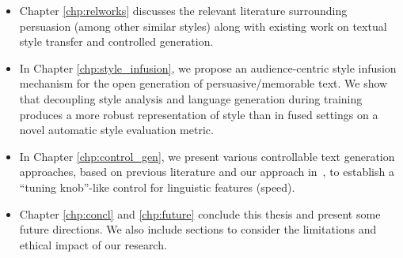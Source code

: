 \begin{itemize}
    \item Chapter \ref{chp:relworks} discusses the relevant literature surrounding persuasion (among other similar styles) along with existing work on textual style transfer and controlled generation.
    \item In Chapter \ref{chp:style_infusion}, we propose an audience-centric style infusion mechanism for the open generation of persuasive/memorable text. We show that decoupling style analysis and language generation during training produces a more robust representation of style than in fused settings on a novel automatic style evaluation metric.
    \item In Chapter \ref{chp:control_gen}, we present various controllable text generation approaches, based on previous literature and our approach in~, to establish a ``tuning knob''-like control for linguistic features (\eg speed).  
    \item Chapter \ref{chp:concl} and \ref{chp:future} conclude this thesis and present some future directions. We also include sections to consider the limitations and ethical impact of our research.
\end{itemize}